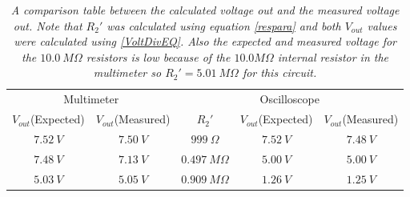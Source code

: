 \documentclass[11pt]{article}
\numberwithin{equation}{section}
\begin{document}
\begin{table}[h]
\begin{center}
\begin{tabular}{cc|ccc}
\multicolumn{2}{c}{Multimeter}	&\multicolumn{3}{c}{Oscilloscope}\\
$V_{out}$(Expected)	&$V_{out}$(Measured) &$R_2'$	&$V_{out}$(Expected)	&$V_{out}$(Measured)\\
\hline
$7.52\ V$	&$7.50\ V$	&$999\ \Omega$		&$7.52\ V$	&$7.48\ V$\\
$7.48\ V$	&$7.13\ V$	&$0.497\ M\Omega$	&$5.00\ V$	&$5.00\ V$\\
$5.03\ V$	&$5.05\ V$	&$0.909\ M\Omega$	&$1.26\ V$	&$1.25\ V$
\end{tabular}
\end{center}
\caption{\textit{A comparison table between the calculated voltage out and the measured voltage out. Note that $R_2'$ was calculated using equation \ref{respara} and both $V_{out}$ values were calculated using \ref{VoltDivEQ}. Also the expected and measured voltage for the $10.0\ M\Omega$ resistors is low because of the $10.0 M\Omega$ internal resistor in the multimeter so $R_2' = 5.01\ M\Omega$ for this circuit.}}
\label{VoltExp}
\end{table}
\end{document}
